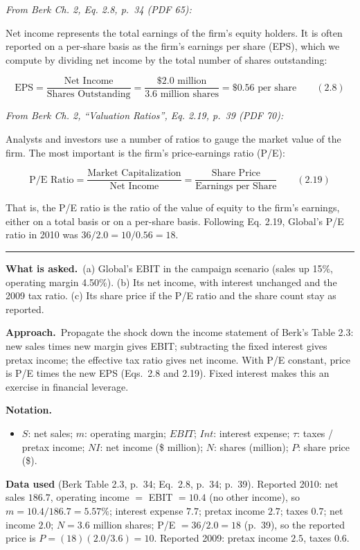 \documentclass[11pt,a4paper]{article}
\newcommand{\notation}{\par\noindent\textbf{Notation.}}
\newcommand{\asked}{\par\medskip\noindent\textbf{What is asked.}~}
\newcommand{\approach}{\par\smallskip\noindent\textbf{Approach.}~}
\newcommand{\stmtend}{\par\endgroup\nopagebreak\noindent\rule{\linewidth}{0.4pt}\par\medskip}
\begin{document}
\emph{From Berk Ch. 2, Eq. 2.8, p.~34 (PDF 65):}

Net income represents the total earnings of the firm's equity holders. It is often reported on a
per-share basis as the firm's earnings per share (EPS), which we compute by dividing net income by
the total number of shares outstanding:

\[\text{EPS} = \frac{\text{Net Income}}{\text{Shares Outstanding}} = \frac{\$2.0 \text{ million}}{3.6 \text{ million shares}} = \$0.56 \text{ per share} \qquad (2.8)\]

\emph{From Berk Ch. 2, ``Valuation Ratios'', Eq. 2.19, p.~39 (PDF 70):}

Analysts and investors use a number of ratios to gauge the market value of the firm. The most
important is the firm's price-earnings ratio (P/E):

\[\text{P/E Ratio} = \frac{\text{Market Capitalization}}{\text{Net Income}} = \frac{\text{Share Price}}{\text{Earnings per Share}} \qquad (2.19)\]

That is, the P/E ratio is the ratio of the value of equity to the firm's earnings, either on a total
basis or on a per-share basis. Following Eq. 2.19, Global's P/E ratio in 2010 was
\(36/2.0 = 10/0.56 = 18\).
\stmtend

\asked (a) Global's EBIT in the campaign scenario (sales up 15\%, operating margin 4.50\%).
(b) Its net income, with interest unchanged and the 2009 tax ratio. (c) Its share price if the
P/E ratio and the share count stay as reported.

\approach Propagate the shock down the income statement of Berk's Table 2.3: new sales times new
margin gives EBIT; subtracting the fixed interest gives pretax income; the effective tax ratio gives
net income. With P/E constant, price is P/E times the new EPS (Eqs.~2.8 and 2.19). Fixed interest
makes this an exercise in financial leverage.

\notation
\begin{itemize}
  \item $S$: net sales; $m$: operating margin; $EBIT$; $Int$: interest expense; $\tau$: taxes /
        pretax income; $NI$: net income (\$ million); $N$: shares (million); $P$: share price (\$).
\end{itemize}
\textbf{Data used} (Berk Table 2.3, p.~34; Eq.~2.8, p.~34; p.~39). Reported 2010: net sales
$186.7$, operating income $=$ EBIT $= 10.4$ (no other income), so $m = 10.4/186.7 = 5.57\%$;
interest expense $7.7$; pretax income $2.7$; taxes $0.7$; net income $2.0$; $N = 3.6$ million
shares; P/E $= 36/2.0 = 18$ (p.~39), so the reported price is $P = (18)(2.0/3.6) = 10$. Reported
2009: pretax income $2.5$, taxes $0.6$.
\end{document}
